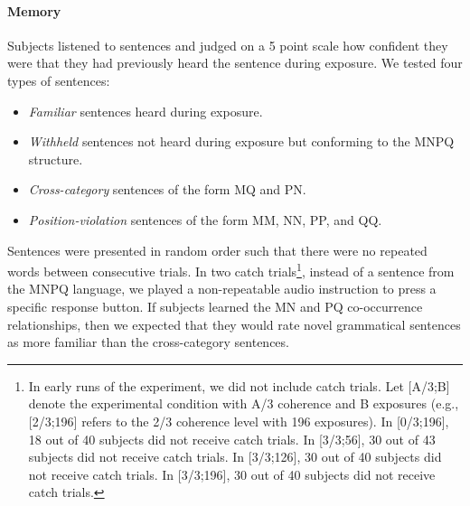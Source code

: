 \documentclass[man,floatsintext]{apa6}
\begin{document}
\paragraph{Memory}
Subjects listened to sentences and judged on a 5 point scale how
confident they were that they had previously heard the sentence during
exposure. We tested four types of sentences:

\begin{itemize}
\item \emph{Familiar} sentences heard during exposure.
\item \emph{Withheld} sentences not heard during exposure but
  conforming to the MNPQ structure.
\item \emph{Cross-category} sentences of the form MQ and PN.
\item \emph{Position-violation} sentences of the form MM, NN, PP, and
  QQ.
\end{itemize}

Sentences were presented in random order such that there were no
repeated words between consecutive trials. In two catch
trials\footnote{In early runs of the experiment, we did not include
  catch trials.  Let [A/3;B] denote the experimental condition with
  A/3 coherence and B exposures (e.g., [2/3;196] refers to the 2/3
  coherence level with 196 exposures). In [0/3;196], 18 out of 40
  subjects did not receive catch trials. In [3/3;56], 30 out of 43
  subjects did not receive catch trials. In [3/3;126], 30 out of 40
  subjects did not receive catch trials. In [3/3;196], 30 out of 40
  subjects did not receive catch trials.}, instead of a sentence from
the MNPQ language, we played a non-repeatable audio instruction to
press a specific response button.  If subjects learned the MN and PQ
co-occurrence relationships, then we expected that they would rate
novel grammatical sentences as more familiar than the cross-category
sentences.
\end{document}
